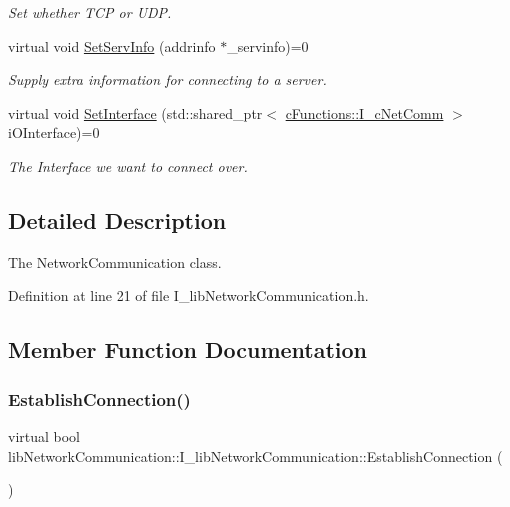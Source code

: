 \begin{DoxyCompactItemize}
\begin{DoxyCompactList}\small\item\em Set whether T\+CP or U\+DP. \end{DoxyCompactList}\item 
virtual void \mbox{\hyperlink{classlibNetworkCommunication_1_1I__libNetworkCommunication_a81430f6597c0831acbd1427fafd02f56}{Set\+Serv\+Info}} (addrinfo $\ast$\+\_\+servinfo)=0
\begin{DoxyCompactList}\small\item\em Supply extra information for connecting to a server. \end{DoxyCompactList}\item 
virtual void \mbox{\hyperlink{classlibNetworkCommunication_1_1I__libNetworkCommunication_a7f23008156d44d5f6db117243ee687e6}{Set\+Interface}} (std\+::shared\+\_\+ptr$<$ \mbox{\hyperlink{classcFunctions_1_1I__cNetComm}{c\+Functions\+::\+I\+\_\+c\+Net\+Comm}} $>$ i\+O\+Interface)=0
\begin{DoxyCompactList}\small\item\em The Interface we want to connect over. \end{DoxyCompactList}\end{DoxyCompactItemize}


\subsection{Detailed Description}
The Network\+Communication class. 

Definition at line 21 of file I\+\_\+lib\+Network\+Communication.\+h.



\subsection{Member Function Documentation}
\mbox{\label{classlibNetworkCommunication_1_1I__libNetworkCommunication_a03c615443e3a028782677c78d559b1c1}} 
\subsubsection{\texorpdfstring{EstablishConnection()}{EstablishConnection()}}
{\footnotesize\ttfamily virtual bool lib\+Network\+Communication\+::\+I\+\_\+lib\+Network\+Communication\+::\+Establish\+Connection (\begin{DoxyParamCaption}{ }\end{DoxyParamCaption})\hspace{0.3cm}{\ttfamily [pure virtual]}}




